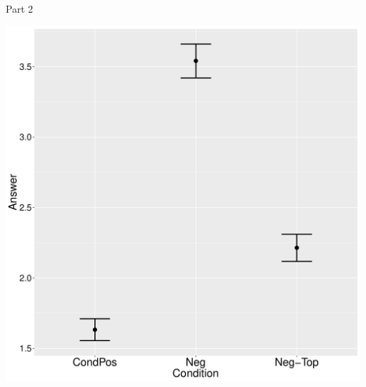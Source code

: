 \documentclass[ignorenonframetext,]{beamer}
\begin{document}
\begin{frame}{Part 2}

\begin{center}
\includegraphics[scale=0.3]{exp1-ani-part_2-errorbars.pdf}
\end{center}

\end{frame}
\end{document}
